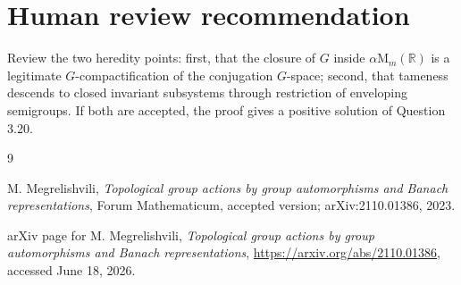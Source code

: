 \documentclass[11pt]{article}
\newcommand{\R}{\mathbb{R}}
\newcommand{\Mat}{\mathrm{M}}
\begin{document}
\section*{Human review recommendation}

Review the two heredity points: first, that the closure of \(G\) inside
\(\alpha\Mat_m(\R)\) is a legitimate \(G\)-compactification of the
conjugation \(G\)-space; second, that tameness descends to closed
invariant subsystems through restriction of enveloping semigroups.  If
both are accepted, the proof gives a positive solution of Question 3.20.

\begin{thebibliography}{9}

M. Megrelishvili,
\emph{Topological group actions by group automorphisms and Banach
representations},
Forum Mathematicum, accepted version; arXiv:2110.01386, 2023.

arXiv page for M. Megrelishvili,
\emph{Topological group actions by group automorphisms and Banach
representations},
\url{https://arxiv.org/abs/2110.01386}, accessed June 18, 2026.

\end{thebibliography}
\end{document}
